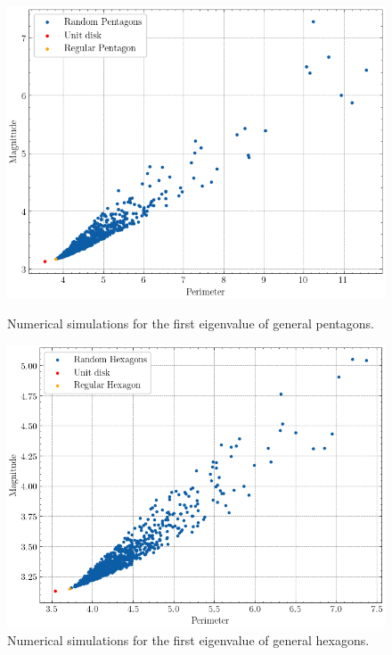 \begin{figure}[!htb]
    \centering
    \begin{minipage}[b]{0.45\textwidth}
        \centering
        \includegraphics[width=1\textwidth]{Images/Dirac/Polygons/pentagons.png}
    \caption{Numerical simulations for the first eigenvalue of general pentagons.}
    \label{dirac_polya_szego_evidence_pentagons}
    \end{minipage}
    \hfill
    \begin{minipage}[b]{0.45\textwidth}
        \centering
        \includegraphics[width=1\textwidth]{Images/Dirac/Polygons/hexagons.png}
    \caption{Numerical simulations for the first eigenvalue of general hexagons.}
    \label{dirac_polya_szego_evidence_hexagons}
    \end{minipage}


\end{figure}
